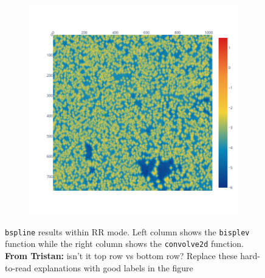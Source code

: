 \documentclass[11pt]{article}
\newcommand{\tristan}[1]{\color{orange}\textbf{From Tristan:} #1\color{black}\xspace}
\begin{document}
\begin{figure}
\begin{subfigure}{0.3\linewidth}
    \caption{}
    \label{fig:bspline_convol2d_mean}
\end{subfigure}
\begin{subfigure}{0.3\linewidth}
    \includegraphics[width=\linewidth]{figure/bspline/convol2d_ret_std_log_portland.png}
    \caption{}
    \label{fig:bspline_convol2d_std}
\end{subfigure}
    \caption{\texttt{bspline} results within RR mode. Left column shows the \texttt{bisplev} function
    while the right column shows the \texttt{convolve2d} function. \tristan{isn't it top row vs bottom row? Replace these hard-to-read explanations with good labels in the figure}}
    \label{fig:bspline_rr}
\end{figure}
\end{document}
